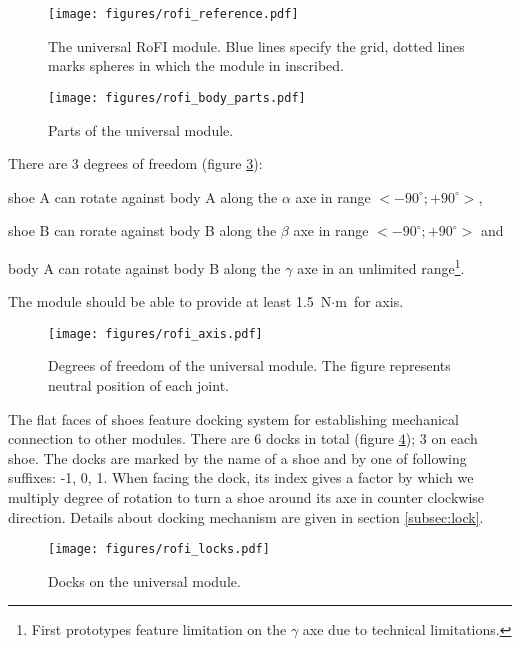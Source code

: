 \begin{figure}
    \centering
    \texttt{[image: figures/rofi\_reference.pdf]}
    \caption{The universal RoFI module. Blue lines specify the grid, dotted
    lines marks spheres in which the module in inscribed. }
    \label{fig:rofi_reference}
\end{figure}

\begin{figure}
    \centering
    \texttt{[image: figures/rofi\_body\_parts.pdf]}
    \caption{Parts of the universal module.}
    \label{fig:rofi_body_parts}
\end{figure}

There are 3 degrees of freedom (figure \ref{fig:rofi_axis}):
\begin{enumerate*}
    \item shoe A can rotate against body A along the $\alpha$ axe in range
    $<-90^\circ; +90^\circ>$,
    \item shoe B can rorate against body B along the $\beta$ axe in range
    $<-90^\circ; +90^\circ>$ and
    \item body A can rotate against body B along the $\gamma$ axe in an
    unlimited range\footnote{First prototypes feature limitation on the $\gamma$
    axe due to technical limitations. }.
\end{enumerate*}
The module should be able to provide at least 1.5 $\text{N}\cdot\text{m}$ for
axis.

\begin{figure}
    \centering
    \texttt{[image: figures/rofi\_axis.pdf]}
    \caption{Degrees of freedom of the universal module. The figure represents neutral position of each joint.}
    \label{fig:rofi_axis}
\end{figure}

The flat faces of shoes feature docking system for establishing mechanical
connection to other modules. There are 6 docks in total (figure
\ref{fig:rofi_locks}); 3 on each shoe. The docks are marked by the name of a
shoe and by one of following suffixes: -1, 0, 1. When facing the dock, its index
gives a factor by which we multiply degree of rotation to turn a shoe around its
axe in counter clockwise direction. Details about docking mechanism are given in
section \ref{subsec:lock}.

\begin{figure}
    \centering
    \texttt{[image: figures/rofi\_locks.pdf]}
    \caption{Docks on the universal module.}
    \label{fig:rofi_locks}
\end{figure}

